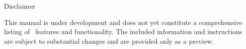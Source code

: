 \newpage

{\Huge 
\vspace*{0.5cm}
\noindent
Disclaimer
} \newline
\vspace*{0.25cm}

\noindent
{\large
This manual is under development and does not yet constitute a comprehensive listing of
\BornAgain\ features and functionality. 
The included information and instructions are subject to substantial changes and
are provided only as a preview.
}
